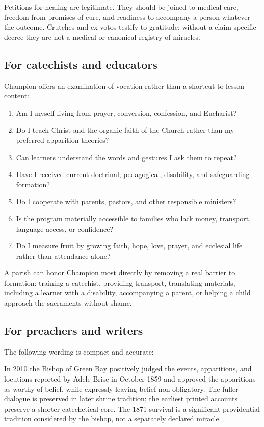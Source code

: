Petitions for healing are legitimate. They should be joined to medical care, freedom from promises of cure, and readiness to accompany a person whatever the outcome. Crutches and ex-votos testify to gratitude; without a claim-specific decree they are not a medical or canonical registry of miracles.

\subsection{For catechists and educators}

Champion offers an examination of vocation rather than a shortcut to lesson content:

\begin{enumerate}
  \item Am I myself living from prayer, conversion, confession, and Eucharist?
  \item Do I teach Christ and the organic faith of the Church rather than my preferred apparition theories?
  \item Can learners understand the words and gestures I ask them to repeat?
  \item Have I received current doctrinal, pedagogical, disability, and safeguarding formation?
  \item Do I cooperate with parents, pastors, and other responsible ministers?
  \item Is the program materially accessible to families who lack money, transport, language access, or confidence?
  \item Do I measure fruit by growing faith, hope, love, prayer, and ecclesial life rather than attendance alone?
\end{enumerate}

A parish can honor Champion most directly by removing a real barrier to formation: training a catechist, providing transport, translating materials, including a learner with a disability, accompanying a parent, or helping a child approach the sacraments without shame.

\subsection{For preachers and writers}

The following wording is compact and accurate:

\begin{studyframe}
In 2010 the Bishop of Green Bay positively judged the events, apparitions, and locutions reported by Adele Brise in October 1859 and approved the apparitions as worthy of belief, while expressly leaving belief non-obligatory. The fuller dialogue is preserved in later shrine tradition; the earliest printed accounts preserve a shorter catechetical core. The 1871 survival is a significant providential tradition considered by the bishop, not a separately declared miracle.
\end{studyframe}

